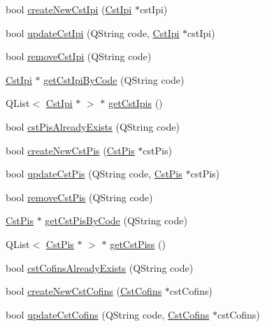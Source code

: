 \begin{DoxyCompactItemize}
\item 
bool \hyperlink{class_database_controller_a10d89cd12f08d7f1644ac5f1ae259db4}{create\-New\-Cst\-Ipi} (\hyperlink{class_cst_ipi}{\-Cst\-Ipi} $\ast$cst\-Ipi)
\item 
bool \hyperlink{class_database_controller_a52ae322bc6022baa4f84a4d7f329cc9b}{update\-Cst\-Ipi} (\-Q\-String code, \hyperlink{class_cst_ipi}{\-Cst\-Ipi} $\ast$cst\-Ipi)
\item 
bool \hyperlink{class_database_controller_a37a2ce12d280a43572784236dc1b9eaa}{remove\-Cst\-Ipi} (\-Q\-String code)
\item 
\hyperlink{class_cst_ipi}{\-Cst\-Ipi} $\ast$ \hyperlink{class_database_controller_a10892f7e7b63d2257bf2461707dc9c4b}{get\-Cst\-Ipi\-By\-Code} (\-Q\-String code)
\item 
\-Q\-List$<$ \hyperlink{class_cst_ipi}{\-Cst\-Ipi} $\ast$ $>$ $\ast$ \hyperlink{class_database_controller_a1aa4959d26014bef2bb6798ae413f16e}{get\-Cst\-Ipis} ()
\item 
bool \hyperlink{class_database_controller_ad98d37e6b16e0eab7a8a4cde455c21db}{cst\-Pis\-Already\-Exists} (\-Q\-String code)
\item 
bool \hyperlink{class_database_controller_a3715e2288761e2337328ec4aabd464fd}{create\-New\-Cst\-Pis} (\hyperlink{class_cst_pis}{\-Cst\-Pis} $\ast$cst\-Pis)
\item 
bool \hyperlink{class_database_controller_a01466e11cad8792c3a6aaca2786f7d9e}{update\-Cst\-Pis} (\-Q\-String code, \hyperlink{class_cst_pis}{\-Cst\-Pis} $\ast$cst\-Pis)
\item 
bool \hyperlink{class_database_controller_aed50b995f598acd86fb69d1b69b4575d}{remove\-Cst\-Pis} (\-Q\-String code)
\item 
\hyperlink{class_cst_pis}{\-Cst\-Pis} $\ast$ \hyperlink{class_database_controller_a088a17f504e8e92aaa54ce5af0f9e19c}{get\-Cst\-Pis\-By\-Code} (\-Q\-String code)
\item 
\-Q\-List$<$ \hyperlink{class_cst_pis}{\-Cst\-Pis} $\ast$ $>$ $\ast$ \hyperlink{class_database_controller_ab87b0573ddcb82a3412126fe7eaf318f}{get\-Cst\-Piss} ()
\item 
bool \hyperlink{class_database_controller_ac07a39fb27350ca7b006e2edf3483936}{cst\-Cofins\-Already\-Exists} (\-Q\-String code)
\item 
bool \hyperlink{class_database_controller_a97c4e322edc3a80071c52566b54adcf8}{create\-New\-Cst\-Cofins} (\hyperlink{class_cst_cofins}{\-Cst\-Cofins} $\ast$cst\-Cofins)
\item 
bool \hyperlink{class_database_controller_a5c4a3e170632556c0ab76238c60a9815}{update\-Cst\-Cofins} (\-Q\-String code, \hyperlink{class_cst_cofins}{\-Cst\-Cofins} $\ast$cst\-Cofins)

\end{DoxyCompactItemize}
